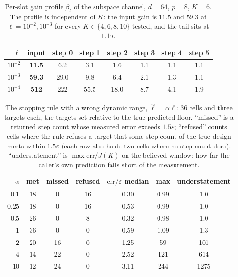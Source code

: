 \begin{table}[h]
\centering
\caption{Per-slot gain profile $\beta_t$ of the subspace channel, $d=64$, $p=8$,
$K=6$.  The profile is independent of $K$: the input gain is $11.5$ and $59.3$
at $\ell=10^{-2},10^{-3}$ for every $K\in\{4,6,8,10\}$ tested, and the tail sits at
$1.1u$.}
\label{tab:profile}
\begin{tabular}{rccccccc}
\toprule
$\ell$ & input & step 0 & step 1 & step 2 & step 3 & step 4 & step 5 \\
\midrule
$10^{-2}$ & \textbf{11.5} & 6.2 & 3.1 & 1.6 & 1.1 & 1.1 & 1.1 \\
$10^{-3}$ & \textbf{59.3} & 29.0 & 9.8 & 6.4 & 2.1 & 1.3 & 1.1 \\
$10^{-4}$ & \textbf{512} & 222 & 55.5 & 18.0 & 8.7 & 4.1 & 1.9 \\
\bottomrule
\end{tabular}
\end{table}

\begin{table}[h]
\centering
\caption{The stopping rule with a wrong dynamic range, $\hat\ell=\alpha\ell$: 36 cells
and three targets each, the targets set relative to the true predicted floor.
``missed'' is a returned step count whose measured error exceeds $1.5\varepsilon$;
``refused'' counts cells where the rule refuses a target that some step count of the
true design meets within $1.5\varepsilon$ (each row also holds two cells where no step
count does).  ``understatement'' is $\max\mathrm{err}/J(K)$ on the believed window: how
far the caller's own prediction falls short of the measurement.}
\label{tab:ell}
\begin{tabular}{rcccccc}
\toprule
$\alpha$ & met & missed & refused & $\mathrm{err}/\varepsilon$ median & max & understatement \\
\midrule
$0.1$  & 18 & 0  & 16 & 0.30 & 0.99 & 1.0 \\
$0.25$ & 18 & 0  & 16 & 0.53 & 0.99 & 1.0 \\
$0.5$  & 26 & 0  & 8  & 0.32 & 0.98 & 1.0 \\
$1$    & 36 & 0  & 0  & 0.59 & 1.09 & 1.3 \\
$2$    & 20 & 16 & 0  & 1.25 & 59   & 101 \\
$4$    & 14 & 22 & 0  & 2.52 & 121  & 614 \\
$10$   & 12 & 24 & 0  & 3.11 & 244  & 1275 \\
\bottomrule
\end{tabular}
\end{table}

